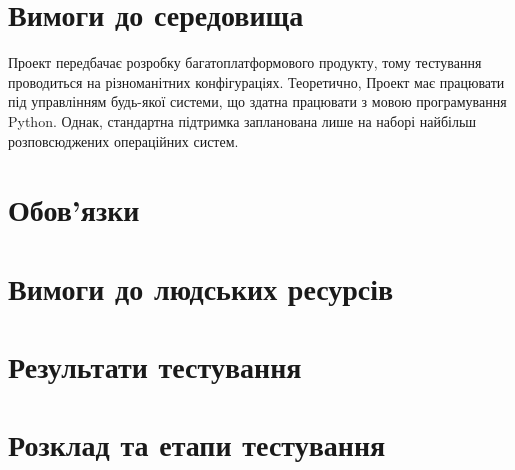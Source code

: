 \documentclass[a4paper,oneside,DIV=12,12pt]{scrartcl}
\begin{document}
	\section{Вимоги до середовища}
		\label{sec:environment-requirements}
		
		Проект передбачає розробку багатоплатформового продукту, тому тестування проводиться на різноманітних конфігураціях. Теоретично, Проект має працювати під управлінням будь-якої системи, що здатна працювати з мовою програмування Python. Однак, стандартна підтримка запланована лише на наборі найбільш розповсюджених операційних систем.
	
	\section{Обов'язки}
	
	\section{Вимоги до людських ресурсів}
		\label{sec:personnel-requirements}
	
	\section{Результати тестування}
	
	\section{Розклад та етапи тестування}
\end{document}

